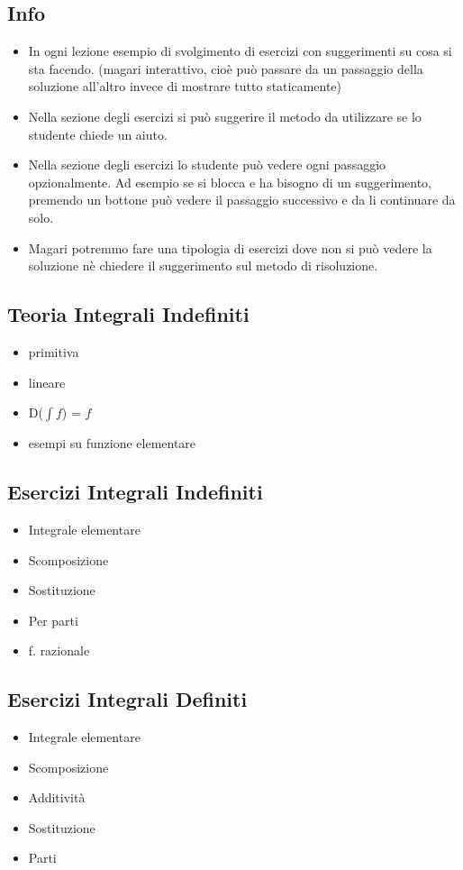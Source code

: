 \documentclass{article}
\begin{document}
	
	\subsection*{Info}
	\begin{itemize}
		
		\item In ogni lezione esempio di svolgimento di esercizi con suggerimenti su cosa si sta facendo. (magari interattivo, cioè può passare da un passaggio della soluzione all'altro invece di mostrare tutto staticamente)
	
		\item Nella sezione degli esercizi si può suggerire il metodo da utilizzare se lo studente chiede un aiuto.
		
		\item Nella sezione degli esercizi lo studente può vedere ogni passaggio opzionalmente. Ad esempio se si blocca e ha bisogno di un suggerimento, premendo un bottone può vedere il passaggio successivo e da li continuare da solo.
		
		\item Magari potremmo fare una tipologia di esercizi dove non si può vedere la soluzione nè chiedere il suggerimento sul metodo di risoluzione.
				
	\end{itemize}


\subsection*{Teoria Integrali Indefiniti}
	\begin{itemize}
	\item primitiva
	\item  lineare
	\item D($\int f$) = $f$
	\item esempi su funzione elementare
	\end{itemize}

\subsection*{Esercizi Integrali Indefiniti}

	\begin{itemize}
		\item Integrale elementare
		\item Scomposizione
		\item Sostituzione
		\item Per parti
		\item f. razionale
	\end{itemize}

\subsection*{Esercizi Integrali Definiti}

\begin{itemize}
	\item Integrale elementare
	\item Scomposizione
	\item Additività
	\item Sostituzione
	\item Parti
\end{itemize}
\end{document}
